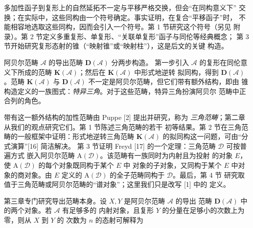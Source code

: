 \clearpage
{}
多加性函子到复形上的自然延拓不一定与平移严格交换，但会“在同构意义下”
交换；在实际中，这些同构由一个符号确定。事实证明，在复合“平移函子”时，
不能相容地选取这些同构，因而会引入一个符号。第 1 节研究这个符号（另见
附录）。第 2 节定义多重复形、单复形、“关联单复形”函子与同伦等经典概念；
第 3 节开始研究复形态射的锥（“映射锥”或“映射柱”），这是后文的关键
构造。

阿贝尔范畴 $\mathcal A$ 的导出范畴 $\mathbf D(\mathcal A)$ 分两步构造。
第一步引入 $\mathcal A$ 的复形在同伦意义下所成的范畴
$\mathbf K(\mathcal A)$；然后在 $\mathbf K(\mathcal A)$ 中形式地逆转
拟同构，得到 $\mathbf D(\mathcal A)$。范畴 $\mathbf K(\mathcal A)$ 与
$\mathbf D(\mathcal A)$ 不一定是阿贝尔范畴，但它们带有额外结构，即由
锥构造定义的一族图式：\emph{特异三角}。对于这些范畴，特异三角扮演阿贝尔
范畴中正合列的角色。

带有这一额外结构的加性范畴由 Puppe [2] 提出并研究，称为
\emph{三角范畴}；第二章从我们的观点研究它们。第 1 节陈述三角范畴的若干
初等结果。第 2 节在三角范畴的一般框架中证明：形式地逆转三角范畴
$\mathbf K(\mathcal A)$ 的拟同构这一问题，可由“分式演算”[16] 简洁解决。
第 3 节证明 Freyd [17] 的一个定理：三角范畴 $\mathcal D$ 可按普遍方式
嵌入阿贝尔范畴 $\mathrm A(\mathcal D)$。该范畴有一族同时为内射且为投射
的对象 $E$，使 $\mathrm A(\mathcal D)$ 的每个对象既同构于某个 $E$ 中
对象的子对象，又同构于某个 $E$ 中对象的商对象。由 $E$ 定义的
$\mathrm A(\mathcal D)$ 的全子范畴同构于 $\mathcal D$。最后，第 4 节
研究取值于三角范畴或阿贝尔范畴的“谱对象”；这里我们只是改写 [1] 中的
定义。

第三章专门研究导出范畴本身。设 $X,Y$ 是阿贝尔范畴 $\mathcal A$ 的导出
范畴 $\mathbf D(\mathcal A)$ 中的两个对象。若 $\mathcal A$ 有足够多的
内射对象，且复形 $Y$ 的分量在足够小的次数上为零，则从 $X$ 到 $Y$ 的
次数为 $n$ 的态射可解释为
